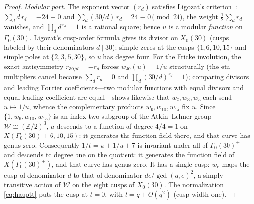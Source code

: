 \documentclass[cntp]{ipart}
\theoremstyle{plain}
\theoremstyle{remark}
\begin{document}
\begin{proof}
\emph{Modular part.} The exponent vector $(r_d)$ satisfies Ligozat's criterion~\cite{Ligozat1975}:
$\sum_d d\,r_d=-24\equiv0$ and $\sum_d(30/d)\,r_d=24\equiv0\pmod{24}$, the weight $\tfrac12\sum_dr_d$
vanishes, and $\prod_d d^{\,r_d}=1$ is a rational square; hence $u$ is a modular \emph{function} on
$\Gamma_0(30)$. Ligozat's cusp-order formula gives its divisor on $X_0(30)$ (cusps labeled by their
denominators $d\mid30$): simple zeros at the cusps $\{1,6,10,15\}$ and simple poles at $\{2,3,5,30\}$, so $u$
has degree four. For the Fricke involution, the exact antisymmetry $r_{30/d}=-r_d$ forces $w_{30}(u)=1/u$
structurally (the eta multipliers cancel because $\sum_dr_d=0$ and $\prod_d(30/d)^{r_d}=1$); comparing
divisors and leading Fourier coefficients---two modular functions with equal divisors and equal leading
coefficient are equal---shows likewise that $w_2,w_3,w_5$ each send $u\mapsto1/u$, whence the complementary
products $w_6,w_{10},w_{15}$ fix $u$. Since $\{1,w_6,w_{10},w_{15}\}$ is an index-two subgroup of the
Atkin--Lehner group $\mathcal{W}\cong(\mathbb{Z}/2)^3$, $u$ descends to a function of degree $4/4=1$ on
$X(\Gamma_0(30){+}6,10,15)$: it generates the function field there, and that curve has genus zero. Consequently
$1/t=u+1/u+7$ is invariant under all of $\Gamma_0(30)^+$ and descends to degree one on the quotient: it
generates the function field of $X(\Gamma_0(30)^+)$, and that curve has genus zero. It has a single cusp: $w_e$ maps the
cusp of denominator $d$ to that of denominator $de/\gcd(d,e)^2$, a simply transitive action of $\mathcal{W}$ on the
eight cusps of $X_0(30)$. The normalization \eqref{eq:hauptt} puts the cusp at $t=0$, with $t=q+O(q^2)$ (cusp
width one).


\end{proof}
\end{document}
